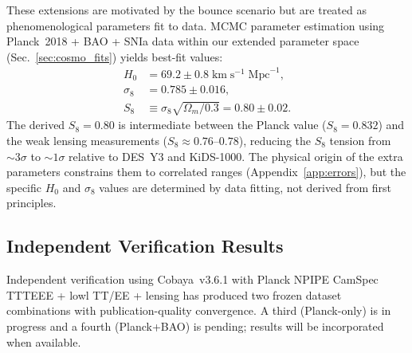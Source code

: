 \documentclass[aps,prd,twocolumn,superscriptaddress,showpacs,preprintnumbers,nofootinbib,longbibliography,floatfix]{revtex4-2}
\begin{document}
These extensions are motivated by the bounce scenario but are treated as phenomenological parameters fit to data. MCMC parameter estimation using Planck~2018 + BAO + SNIa data within our extended parameter space (Sec.~\ref{sec:cosmo_fits}) yields best-fit values:
\begin{align}
H_0 &= 69.2\pm 0.8\;\text{km}\;\text{s}^{-1}\;\text{Mpc}^{-1},\label{eq:H0}\\
\sigma_8 &= 0.785\pm 0.016,\label{eq:s8}\\
S_8 &\equiv \sigma_8\sqrt{\Omega_m/0.3} = 0.80 \pm 0.02.\label{eq:S8result}
\end{align}
The derived $S_8 = 0.80$ is intermediate between the Planck value ($S_8 = 0.832$) and the weak lensing measurements ($S_8 \approx 0.76$--$0.78$), reducing the $S_8$ tension from $\sim 3\sigma$ to $\sim 1\sigma$ relative to DES~Y3 and KiDS-1000.
The physical origin of the extra parameters constrains them to correlated ranges (Appendix~\ref{app:errors}), but the specific $H_0$ and $\sigma_8$ values are determined by data fitting, not derived from first principles.

\subsection{Independent Verification Results}\label{sec:verification}

Independent verification using Cobaya~v3.6.1 with Planck NPIPE CamSpec TTTEEE + lowl TT/EE + lensing has produced two frozen dataset combinations with publication-quality convergence. A third (Planck-only) is in progress and a fourth (Planck+BAO) is pending; results will be incorporated when available.
\end{document}
